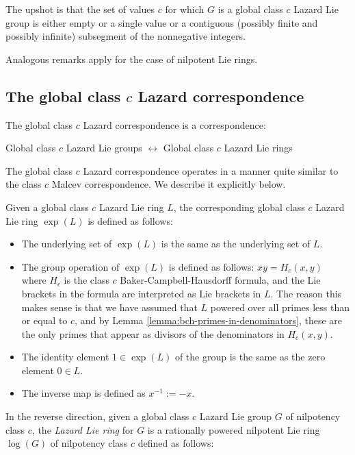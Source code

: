 The upshot is that the set of values $c$ for which $G$ is a global
class $c$ Lazard Lie group is either empty or a single value or a
contiguous (possibly finite and possibly infinite) subsegment of the
nonnegative integers.

Analogous remarks apply for the case of nilpotent Lie rings.

\subsection{The global class $c$ Lazard correspondence}

The global class $c$ Lazard correspondence is a correspondence:

\begin{center}
  Global class $c$ Lazard Lie groups $\leftrightarrow$ Global class $c$
  Lazard Lie rings
\end{center}
The global class $c$ Lazard correspondence operates in a manner quite
similar to the class $c$ Malcev correspondence. We describe it
explicitly below.

Given a global class $c$ Lazard Lie ring $L$, the corresponding global
class $c$ Lazard Lie ring $\exp(L)$ is defined as follows:

\begin{itemize}
\item The underlying set of $\exp(L)$ is the same as the underlying set of
  $L$.
\item The group operation of $\exp(L)$ is defined as follows: $xy =
  H_c(x,y)$ where $H_c$ is the class $c$ Baker-Campbell-Hausdorff
  formula, and the Lie brackets in the formula are interpreted as Lie
  brackets in $L$. The reason this makes sense is that we have assumed
  that $L$ powered over all primes less than or equal to $c$, and by
  Lemma \ref{lemma:bch-primes-in-denominators}, these are the only
  primes that appear as divisors of the denominators in $H_c(x,y)$.
\item The identity element $1 \in \exp(L)$ of the group is the same as the
  zero element $0 \in L$.
\item The inverse map is defined as $x^{-1} := -x$.
\end{itemize}

In the reverse direction, given a global class $c$ Lazard Lie group
$G$ of nilpotency class $c$, the {\em Lazard Lie ring} for $G$ is a
rationally powered nilpotent Lie ring $\log(G)$ of nilpotency class $c$
defined as follows:

